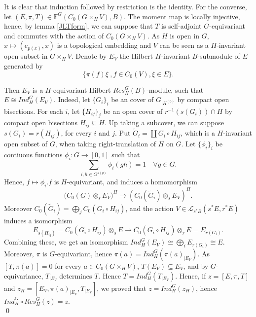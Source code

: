 \begin{dem}
It is clear that induction followed by restriction is the identity. For the converse, let $(E,\pi,T)\in \mathbb E^G(C_0(G\times_H V),B)$. The moment map is locally injective, hence, by lemma \ref{JLTform}, we can suppose that $T$ is self-adjoint $G$-equivariant and commutes with the action of $C_0(G\times_H V)$. As $H$ is open in $G$, $x\mapsto (e_{p(x)},x)$ is a topological embedding and $V$ can be seen as a $H$-invariant open subset in $G\times_H V$. Denote by $E_V$ the Hilbert $H$-invariant $B$-submodule of $E$ generated by 
\[\{\pi(f)\xi \ ,f\in C_0(V), \xi\in E\}.\]

Then $E_{V}$ is a $H$-equivariant Hilbert $Res_H^G(B)$-module, such that $E\cong Ind_H^G (E_V)$. Indeed, let $\{G_i\}_i$ be an cover of $G_{|H^{(0)}}$ by compact open bisections. For each $i$, let $\{H_{ij}\}_j$ be an open cover of $r^{-1}( s(G_i))\cap H$ by compact open bisections $H_{ij} \subseteq H$. Up taking a subcover, we can suppose $s(G_i) = r(H_{ij})$, for every $i$ and $j$. Put $\tilde G_i = \coprod G_i \circ H_{ij}$, which is a $H$-invariant open subset of $G$, when taking right-translation of $H$ on $G$. Let $\{\phi_i\}_i$ be contiuous functions $\phi_i : G\rightarrow [0,1]$ such that 
\[\sum_{i, h\in G^{s(g)}} \phi_i(gh) = 1\quad \forall g\in G.\]
Hence, $f\mapsto \phi_i . f$ is $H$-equivariant, and induces a homomorphism 
\[\Big(C_0(G)\otimes_s E_V\Big)^H \rightarrow \left( C_0(\tilde G_i)\otimes_s E_V\right)^H .\] 
Moreover $C_0(\tilde G_i) = \bigoplus_j C_0(G_i\circ H_{ij})$, and the action $V\in \mathcal L_{s^*B}(s^* E, r^* E)$ induces a isomorphism
\[ E_{s(H_{ij})}=C_0(G_i\circ H_{ij})\otimes_s E \rightarrow C_0(G_i\circ H_{ij})\otimes_r E = E_{r(G_{i})}. \]
Combining these, we get an isomorphism $Ind_H^G (E_V) \cong \bigoplus_i E_{r(G_i)} \cong E $.\\

Moreover, $\pi$ is $G$-equivariant, hence $\pi(a) = Ind_H^G (\pi(a)_{|E_V} )$. As $[T,\pi(a)]=0$ for every $a\in C_0(G\times_H V)$, $T(E_V)\subseteq E_V$, and by $G$-equivariance, $T_{|E_V}$ determines $T$. Hence $T= Ind_H^G (T_{|E_V})$. Hence, if $z=[E,\pi,T]$ and $z_H =[E_V,\pi(a)_{|E_V},T_{|E_V}]$, we proved that $z = Ind_H^G( z_H)$, hence $Ind_H^G \circ Res_H^G (z)= z$.\\
\qed  
\end{dem}

